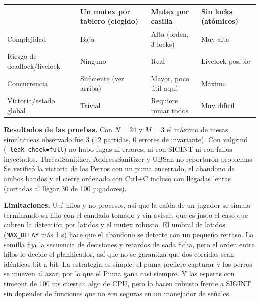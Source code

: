\documentclass[11pt,a4paper]{article}
\newcommand{\cod}[1]{\texttt{\small #1}}
\begin{document}
\begin{center}
\small
\begin{tabular}{@{}>{\raggedright\arraybackslash}p{3.6cm}>{\raggedright\arraybackslash}p{4.2cm}>{\raggedright\arraybackslash}p{3.8cm}>{\raggedright\arraybackslash}p{4.0cm}@{}}
\toprule
 & \textbf{Un mutex por tablero (elegido)} & \textbf{Mutex por casilla} & \textbf{Sin locks (atómicos)} \\
\midrule
Complejidad & Baja & Alta (orden, 3 locks) & Muy alta \\
Riesgo de deadlock/livelock & Ninguno & Real & Livelock posible \\
Concurrencia & Suficiente (ver arriba) & Mayor, poco útil aquí & Máxima \\
Victoria/estado global & Trivial & Requiere tomar todos & Muy difícil \\
\bottomrule
\end{tabular}
\end{center}

\textbf{Resultados de las pruebas.} Con $N=24$ y $M=3$ el máximo de mesas simultáneas observado fue 3 (12 partidas, 0 errores de invariante). Con valgrind (\cod{--leak-check=full}) no hubo fugas ni errores, ni con SIGINT ni con fallos inyectados. ThreadSanitizer, AddressSanitizer y UBSan no reportaron problemas. Se verificó la victoria de los Perros con un puma encerrado, el abandono de ambos bandos y el cierre ordenado con Ctrl+C incluso con llegadas lentas (cortadas al llegar 30 de 100 jugadores).

\textbf{Limitaciones.} Usé hilos y no procesos, así que la caída de un jugador se simula terminando su hilo con el candado tomado y sin avisar, que es justo el caso que cubren la detección por latidos y el mutex robusto. El umbral de latidos (\cod{MAX\_DELAY} más 1 s) hace que el abandono se detecte con un pequeño retraso. La semilla fija la secuencia de decisiones y retardos de cada ficha, pero el orden entre hilos lo decide el planificador, así que no se garantiza que dos corridas sean idénticas bit a bit. La estrategia es simple: el puma prefiere capturar y los perros se mueven al azar, por lo que el Puma gana casi siempre. Y las esperas con timeout de 100 ms cuestan algo de CPU, pero lo hacen robusto frente a SIGINT sin depender de funciones que no son seguras en un manejador de señales.
\end{document}
